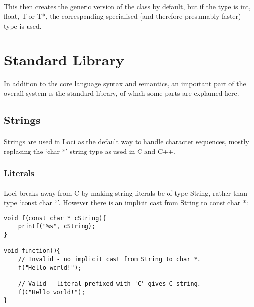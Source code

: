\documentclass[12pt,twoside,notitlepage]{report}
\begin{document}
\paragraph{}
This then creates the generic version of the class by default, but if the type is int, float, T or T*, the corresponding specialised (and therefore presumably faster) type is used.

\clearpage

\section{Standard Library}

\paragraph{}
In addition to the core language syntax and semantics, an important part of the overall system is the standard library, of which some parts are explained here.

\subsection{Strings}

\paragraph{}
Strings are used in Loci as the default way to handle character sequences, mostly replacing the `char *' string type as used in C and C++.

\subsubsection{Literals}

\paragraph{}
Loci breaks away from C by making string literals be of type String, rather than type `const char *'. However there is an implicit cast from String to const char *:


\begin{lstlisting}
void f(const char * cString){
	printf("%s", cString);
}

void function(){
	// Invalid - no implicit cast from String to char *.
	f("Hello world!");
	
	// Valid - literal prefixed with 'C' gives C string.
	f(C"Hello world!");
}
\end{lstlisting}
\end{document}
